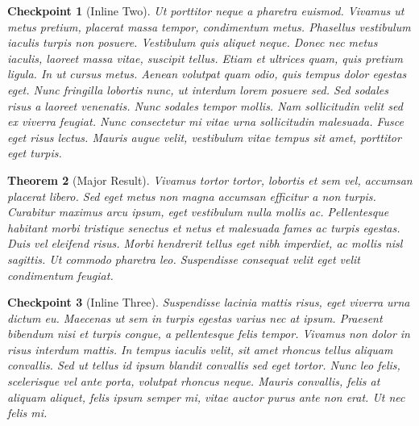 \documentclass[pdflatex]{sn-jnl}
\theoremstyle{thmstyleone}%
\newtheorem{theorem}{Theorem}[section]
\theoremstyle{thmstyletwo}%
\newtheorem{inlineexercise}[theorem]{Checkpoint}
\theoremstyle{thmstylethree}%
\numberwithin{equation}{section}
\begin{document}
\begin{inlineexercise}[Inline Two]\label{duplicate-inline}%
%
Ut porttitor neque a pharetra euismod. Vivamus ut metus pretium, placerat massa tempor, condimentum metus. Phasellus vestibulum iaculis turpis non posuere. Vestibulum quis aliquet neque. Donec nec metus iaculis, laoreet massa vitae, suscipit tellus. Etiam et ultrices quam, quis pretium ligula. In ut cursus metus. Aenean volutpat quam odio, quis tempus dolor egestas eget. Nunc fringilla lobortis nunc, ut interdum lorem posuere sed. Sed sodales risus a laoreet venenatis. Nunc sodales tempor mollis. Nam sollicitudin velit sed ex viverra feugiat. Nunc consectetur mi vitae urna sollicitudin malesuada. Fusce eget risus lectus. Mauris augue velit, vestibulum vitae tempus sit amet, porttitor eget turpis.%
\end{inlineexercise}%
\begin{theorem}[Major Result]\label{section-exercises-single-8}%
%
Vivamus tortor tortor, lobortis et sem vel, accumsan placerat libero. Sed eget metus non magna accumsan efficitur a non turpis. Curabitur maximus arcu ipsum, eget vestibulum nulla mollis ac. Pellentesque habitant morbi tristique senectus et netus et malesuada fames ac turpis egestas. Duis vel eleifend risus. Morbi hendrerit tellus eget nibh imperdiet, ac mollis nisl sagittis. Ut commodo pharetra leo. Suspendisse consequat velit eget velit condimentum feugiat.%
\end{theorem}
\begin{inlineexercise}[Inline Three]\label{section-exercises-single-9}%
%
Suspendisse lacinia mattis risus, eget viverra urna dictum eu. Maecenas ut sem in turpis egestas varius nec at ipsum. Praesent bibendum nisi et turpis congue, a pellentesque felis tempor. Vivamus non dolor in risus interdum mattis. In tempus iaculis velit, sit amet rhoncus tellus aliquam convallis. Sed ut tellus id ipsum blandit convallis sed eget tortor. Nunc leo felis, scelerisque vel ante porta, volutpat rhoncus neque. Mauris convallis, felis at aliquam aliquet, felis ipsum semper mi, vitae auctor purus ante non erat. Ut nec felis mi.%
\end{inlineexercise}%
%
%
\typeout{************************************************}
\typeout{************************************************}
%
\end{document}
